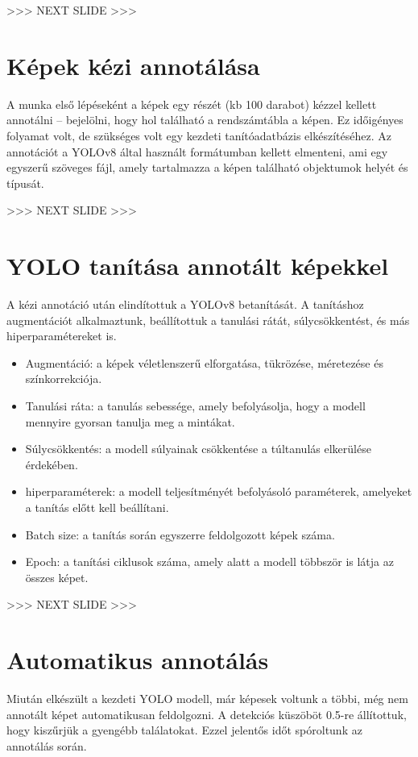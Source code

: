 \documentclass[12pt]{article}
\begin{document}
>>> NEXT SLIDE >>>

\section*{Képek kézi annotálása}

A munka első lépéseként a képek egy részét (kb 100 darabot) kézzel kellett annotálni – bejelölni, hogy hol található a rendszámtábla a képen.
Ez időigényes folyamat volt, de szükséges volt egy kezdeti tanítóadatbázis elkészítéséhez.
Az annotációt a YOLOv8 által használt formátumban kellett elmenteni, ami egy egyszerű szöveges fájl, amely tartalmazza a képen található objektumok helyét és típusát.

>>> NEXT SLIDE >>>

\section*{YOLO tanítása annotált képekkel}

A kézi annotáció után elindítottuk a YOLOv8 betanítását.
A tanításhoz augmentációt alkalmaztunk, beállítottuk a tanulási rátát, súlycsökkentést, és más hiperparamétereket is.

\begin{itemize}[noitemsep]
	\item Augmentáció: a képek véletlenszerű elforgatása, tükrözése, méretezése és színkorrekciója.
	\item Tanulási ráta: a tanulás sebessége, amely befolyásolja, hogy a modell mennyire gyorsan tanulja meg a mintákat.
	\item Súlycsökkentés: a modell súlyainak csökkentése a túltanulás elkerülése érdekében.
	\item hiperparaméterek: a modell teljesítményét befolyásoló paraméterek, amelyeket a tanítás előtt kell beállítani.
	\item Batch size: a tanítás során egyszerre feldolgozott képek száma.
	\item Epoch: a tanítási ciklusok száma, amely alatt a modell többször is látja az összes képet.
\end{itemize}

>>> NEXT SLIDE >>>

\section*{Automatikus annotálás}

Miután elkészült a kezdeti YOLO modell, már képesek voltunk a többi, még nem annotált képet automatikusan feldolgozni.
A detekciós küszöböt 0.5-re állítottuk, hogy kiszűrjük a gyengébb találatokat.
Ezzel jelentős időt spóroltunk az annotálás során.
\end{document}
